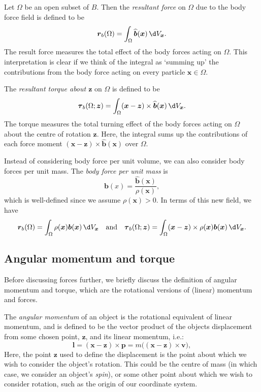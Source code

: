 \documentclass[
  letterpaper,
  DIV=11,
  numbers=noendperiod]{scrreprt}
\theoremstyle{plain}
\theoremstyle{remark}
\begin{document}
Let \(\Omega\) be an open subset of \(B\). Then the \emph{resultant
force} on \(\Omega\) due to the body force field is defined to be
\[{\boldsymbol{r}}_b(\Omega) = \int_\Omega \widehat{{\boldsymbol{b}}}({\boldsymbol{x}}){\,\d V_{{\boldsymbol{x}}}}.\]
The result force measures the total effect of the body forces acting on
\(\Omega\). This interpretation is clear if we think of the integral as
`summing up' the contributions from the body force acting on every
particle \({\boldsymbol{x}}\in \Omega\).

The \emph{resultant torque about \({\boldsymbol{z}}\)} on \(\Omega\) is
defined to be
\[{\boldsymbol{\tau}}_b(\Omega;{\boldsymbol{z}}) = \int_\Omega ({\boldsymbol{x}}-{\boldsymbol{z}})\times \widehat{{\boldsymbol{b}}}({\boldsymbol{x}}){\,\d V_{{\boldsymbol{x}}}}.\]
The torque measures the total turning effect of the body forces acting
on \(\Omega\) about the centre of rotation \({\boldsymbol{z}}\). Here,
the integral sums up the contributions of each force moment
\(({\boldsymbol{x}}-{\boldsymbol{z}})\times\widehat{{\boldsymbol{b}}}({\boldsymbol{x}})\)
over \(\Omega\).

Instead of considering body force per unit volume, we can also consider
body forces per unit mass. The \emph{body force per unit mass} is
\[{\boldsymbol{b}}(x) = \frac{\widehat{{\boldsymbol{b}}}({\boldsymbol{x}})}{\rho({\boldsymbol{x}})},\]
which is well-defined since we assume \(\rho({\boldsymbol{x}})>0\). In
terms of this new field, we have
\[{\boldsymbol{r}}_b(\Omega) = \int_\Omega \rho({\boldsymbol{x}}){\boldsymbol{b}}({\boldsymbol{x}}){\,\d V_{{\boldsymbol{x}}}}\quad\text{and}\quad
  {\boldsymbol{\tau}}_b(\Omega;{\boldsymbol{z}}) = \int_\Omega ({\boldsymbol{x}}-{\boldsymbol{z}})\times \rho({\boldsymbol{x}}){\boldsymbol{b}}({\boldsymbol{x}}){\,\d V_{{\boldsymbol{x}}}}.\]

\subsection{Angular momentum and
torque}\label{angular-momentum-and-torque}

Before discussing forces further, we briefly discuss the definition of
angular momentum and torque, which are the rotational versions of
(linear) momentum and forces.

The \emph{angular momentum} of an object is the rotational equivalent of
linear momentum, and is defined to be the vector product of the objects
displacement from some chosen point, \({\boldsymbol{z}}\), and its
linear momentum, i.e.:
\[{\boldsymbol{l}}= ({\boldsymbol{x}}-{\boldsymbol{z}})\times{\boldsymbol{p}}= m\big(({\boldsymbol{x}}-{\boldsymbol{z}})\times{\boldsymbol{v}}\big),\]
Here, the point \({\boldsymbol{z}}\) used to define the displacement is
the point about which we wish to consider the object's rotation. This
could be the centre of mass (in which case, we consider an object's
\emph{spin}), or some other point about which we wish to consider
rotation, such as the origin of our coordinate system.
\end{document}

